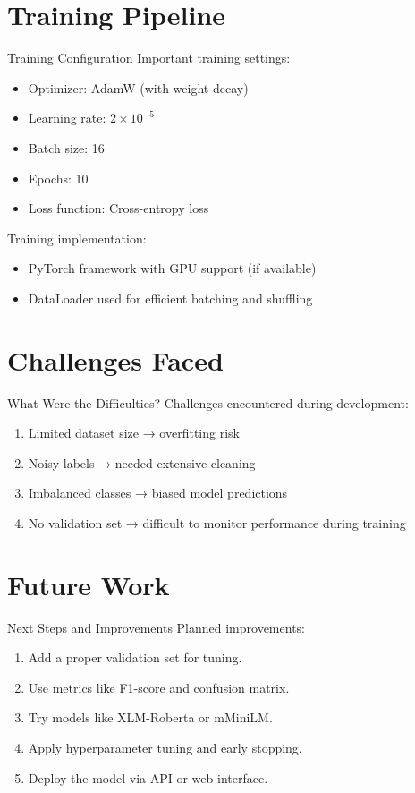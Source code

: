 \documentclass[aspectratio=169]{beamer}
\begin{document}
\section{Training Pipeline}
\begin{frame}{Training Configuration}
  Important training settings:
  \begin{itemize}
    \item Optimizer: AdamW (with weight decay)
    \item Learning rate: \(2\times10^{-5}\)
    \item Batch size: 16
    \item Epochs: 10
    \item Loss function: Cross-entropy loss
  \end{itemize}

  Training implementation:
  \begin{itemize}
    \item PyTorch framework with GPU support (if available)
    \item DataLoader used for efficient batching and shuffling
  \end{itemize}
\end{frame}

\section{Challenges Faced}
\begin{frame}{What Were the Difficulties?}
  Challenges encountered during development:
  \begin{enumerate}
    \item Limited dataset size → overfitting risk
    \item Noisy labels → needed extensive cleaning
    \item Imbalanced classes → biased model predictions
    \item No validation set → difficult to monitor performance during training
  \end{enumerate}
\end{frame}

\section{Future Work}
\begin{frame}{Next Steps and Improvements}
  Planned improvements:
  \begin{enumerate}
    \item Add a proper validation set for tuning.
    \item Use metrics like F1-score and confusion matrix.
    \item Try models like XLM-Roberta or mMiniLM.
    \item Apply hyperparameter tuning and early stopping.
    \item Deploy the model via API or web interface.
  \end{enumerate}
\end{frame}
\end{document}
